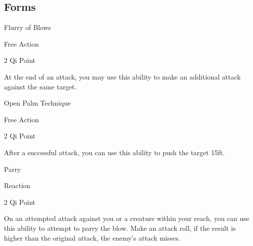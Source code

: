 \vspace{.1 in}

\subsection*{Forms}
\lipsum[1]

\vspace{.2 in}
\begin{monsterbox}{Flurry of Blows}
	\hline
	\begin{monsteraction}[Action]
		Free Action
	\end{monsteraction}
	\hspace{1cm}
	\begin{monsteraction}[Cost]
		2 Qi Point
	\end{monsteraction}
	
	At the end of an attack, you may use this ability to make an additional attack against the same target.
	
\end{monsterbox}

\begin{monsterbox}{Open Palm Technique}
	\hline
	\begin{monsteraction}[Action]
		Free Action
	\end{monsteraction}
	\hspace{1cm}
	\begin{monsteraction}[Cost]
		2 Qi Point
	\end{monsteraction}
	
	After a successful attack, you can use this ability to push the target 15ft.
\end{monsterbox}

\begin{monsterbox}{Parry}
	\hline
	\begin{monsteraction}[Action]
		Reaction
	\end{monsteraction}
	\hspace{1cm}
	\begin{monsteraction}[Cost]
		2 Qi Point
	\end{monsteraction}
	
	On an attempted attack against you or a creature within your reach, you can use this ability to attempt to parry the blow. Make an attack roll, if the result is higher than the original attack, the enemy's attack misses. 
	
\end{monsterbox}

\vspace{.1 in}

